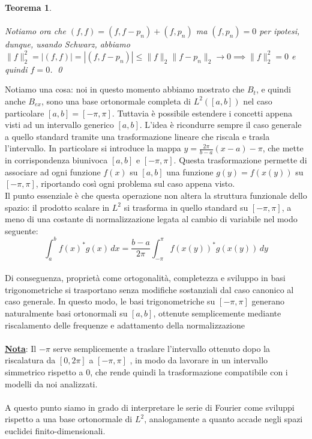 \documentclass[a4paper,12pt]{report}
\newtheorem{teorema}{Teorema}[chapter]
\begin{document}
\begin{teorema}
    \\
    \\ Notiamo ora che $(f,f)=(f,f-p_n)+(f,p_n)$ ma $(f,p_n)=0$ per ipotesi, dunque, usando Schwarz, abbiamo $\|f\|_2^2=|(f,f)|=|(f,f-p_n)|\leq\|f\|_2\|f-p_n\|_2\to 0\implies \|f\|_2^2=0$ e quindi $f=0$. \qed
\end{teorema}

Notiamo una cosa: noi in questo momento abbiamo mostrato che $B_t$, e quindi anche $B_{ex}$, sono una base ortonormale completa di $L^2([a,b])$ nel caso particolare $[a,b]=[-\pi,\pi]$. Tuttavia è possibile estendere i concetti appena visti ad un intervallo generico $[a,b]$. L’idea è ricondurre sempre il caso generale a quello standard tramite una trasformazione lineare che riscala e trasla l’intervallo. In particolare si introduce la mappa $y=\displaystyle\frac{2\pi}{b-a}(x-a)-\pi$, che mette in corrispondenza biunivoca $[a,b]$ e $[-\pi,\pi]$. Questa trasformazione permette di associare ad ogni funzione $f(x)$ su $[a,b]$ una funzione $g(y)=f(x(y))$ su $[-\pi,\pi]$, riportando così ogni problema sul caso appena visto.
\\
Il punto essenziale è che questa operazione non altera la struttura funzionale dello spazio: il prodotto scalare in $L^2$ si trasforma in quello standard su $[-\pi,\pi]$, a meno di una costante di normalizzazione legata al cambio di variabile nel modo seguente:
\\
\[
\displaystyle\int_a^bf(x)^*g(x)\,dx=\frac{b-a}{2\pi}\int_{-\pi}^\pi f(x(y))^*g(x(y))\,dy
\]
\\Di conseguenza, proprietà come ortogonalità, completezza e sviluppo in basi trigonometriche si trasportano senza modifiche sostanziali dal caso canonico al caso generale. In questo modo, le basi trigonometriche su $[-\pi,\pi]$ generano naturalmente basi ortonormali su $[a,b]$, ottenute semplicemente mediante riscalamento delle frequenze e adattamento della normalizzazione
\\
\\ \underline{\textbf{Nota}}: Il $-\pi$ serve semplicemente a traslare l’intervallo ottenuto dopo la riscalatura da $[0,2\pi]$ a $[-\pi,\pi]$ , in modo da lavorare in un intervallo simmetrico rispetto a 0, che rende quindi la trasformazione compatibile con i modelli da noi analizzati.
\\
\\ A questo punto siamo in grado di interpretare le serie di Fourier come sviluppi rispetto a una base ortonormale di $L^2$, analogamente a quanto accade negli spazi euclidei finito-dimensionali.
\end{document}
